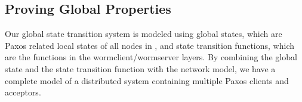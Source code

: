 




\subsection{Proving Global Properties}
\label{subsec:safety_verification}


Our global state transition system is modeled using global states, which are Paxos related local states of all nodes in \sysname{}, and state transition functions, which are the functions in the wormclient/wormserver layers. By combining the global state and the state transition function with the network model, we have a complete model of a distributed system containing multiple Paxos clients and acceptors.


